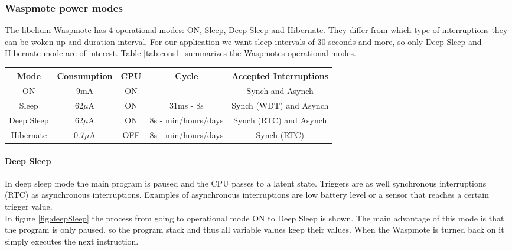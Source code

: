 \subsubsection{Waspmote power modes}
\label{dynPow}
The libelium Waspmote has 4 operational modes: ON, Sleep, Deep Sleep and Hibernate. They differ from which type of interruptions they can be woken up and duration interval. For our application we want sleep intervals of 30 seconds and more, so only Deep Sleep and Hibernate mode are of interest. Table \ref{tab:cons1} summarizes the Waspmotes operational modes.
\begin{table*}[!ht]
\begin{center}
\begin{tabular}[!ht]{|c|c|c|c|c|}
\hline
\textbf{Mode} & \textbf{Consumption} & \textbf{CPU} & \textbf{Cycle} & \textbf{Accepted Interruptions}\\
\hline
ON & 9mA & ON & - & Synch and Asynch\\
\hline
Sleep & 62$\mu$A  & ON & 31ms - 8s & Synch (WDT) and Asynch\\
\hline
Deep Sleep & 62$\mu$A & ON & 8s - min/hours/days & Synch (RTC) and Asynch\\
\hline
Hibernate & 0.7$\mu$A & OFF & 8s - min/hours/days & Synch (RTC)\\
\hline
\end{tabular}
\caption{Operational modes of Libelium Waspmote V1.1}
\label{tab:cons1}
\end{center}
\end{table*}
\paragraph{Deep Sleep}
In deep sleep mode the main program is paused and the CPU passes to a latent state. Triggers are as well synchronous interruptions (RTC) as asynchronous interruptions. Examples of asynchronous interruptions are low battery level or a sensor that reaches a certain trigger value.\bigskip
\\In figure \ref{fig:deepSleep} the process from going to operational mode ON to Deep Sleep is shown. The main advantage of this mode is that the program is only paused, so the program stack and thus all variable values keep their values. When the Waspmote is turned back on it simply executes the next instruction.
